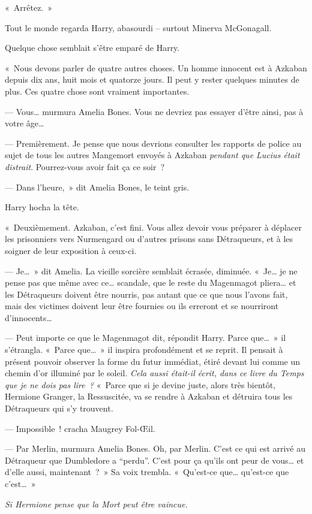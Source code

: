 «~Arrêtez.~»

Tout le monde regarda Harry, abasourdi -- surtout Minerva McGonagall.

Quelque chose semblait s'être emparé de Harry.

«~Nous devons parler de quatre autres choses. Un homme innocent est à Azkaban depuis dix ans, huit mois et quatorze jours. Il peut y rester quelques minutes de plus. Ces quatre chose sont vraiment importantes.

--- Vous… murmura Amelia Bones. Vous ne devriez pas essayer d'être ainsi, pas à votre âge…

--- Premièrement. Je pense que nous devrions consulter les rapports de police au sujet de tous les autres Mangemort envoyés à Azkaban \emph{pendant que Lucius était distrait}. Pourrez-vous avoir fait ça ce soir~?

--- Dans l'heure,~» dit Amelia Bones, le teint gris.

Harry hocha la tête.

«~Deuxièmement. Azkaban, c'est fini. Vous allez devoir vous préparer à déplacer les prisonniers vers Nurmengard ou d'autres prisons sans Détraqueurs, et à les soigner de leur exposition à ceux-ci.

--- Je…~» dit Amelia. La vieille sorcière semblait écrasée, diminuée. «~Je… je ne pense pas que même avec ce… scandale, que le reste du Magenmagot pliera… et les Détraqueurs doivent être nourris, pas autant que ce que nous l'avons fait, mais des victimes doivent leur être fournies ou ils erreront et se nourriront d'innocents…

--- Peut importe ce que le Magenmagot dit, répondit Harry. Parce que…~» il s'étrangla. «~Parce que…~» il inspira profondément et se reprit. Il pensait à présent pouvoir observer la forme du futur immédiat, étiré devant lui comme un chemin d'or illuminé par le soleil. \emph{Cela aussi était-il écrit, dans ce livre du Temps que je ne dois pas lire~?} «~Parce que si je devine juste, alors très bientôt, Hermione Granger, la Ressuscitée, va se rendre à Azkaban et détruira tous les Détraqueurs qui s'y trouvent.

--- Impossible~! cracha Maugrey Fol-Œil.

--- Par Merlin, murmura Amelia Bones. Oh, par Merlin. C'est ce qui est arrivé au Détraqueur que Dumbledore a “perdu”. C'est pour ça qu'ils ont peur de vous… et d'elle aussi, maintenant~?~» Sa voix trembla. «~Qu'est-ce que… qu'est-ce que c'est…~»

\emph{Si Hermione pense que la Mort peut être vaincue.}

